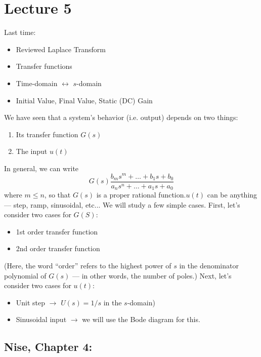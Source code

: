 \documentclass{book}
\begin{document}
\chapter*{Lecture 5}
Last time:
\begin{itemize}
	\item Reviewed Laplace Transform
	\item Transfer functions
	\item Time-domain $ \leftrightarrow $ $ s $-domain
	\item Initial Value, Final Value, Static (DC) Gain
\end{itemize}

We have seen that a system's behavior (i.e. output) depends on two things:
\begin{enumerate}
	\item Its transfer function $ G(s) $
	\item The input $ u(t) $
\end{enumerate}
In general, we can write
\[ G(s) \frac{b_ms^m+\ldots+b_1s+b_0}{a_ns^n+\ldots+a_1s+a_0} \]
where $ m\leq n $, so that $ G(s) $ is a proper rational function.$ u(t) $ can be anything --- step, ramp, sinusoidal, etc... We will study a few simple cases. First, let's consider two cases for $ G(S) $:
\begin{itemize}
	\item 1st order transfer function
	\item 2nd order transfer function
\end{itemize}
(Here, the word ``order'' refers to the highest power of $ s $ in the denominator polynomial of $ G(s) $ --- in other words, the number of poles.) Next, let's consider two cases for $ u(t) $:
\begin{itemize}
	\item Unit step $\rightarrow $ $ U(s)=1/s $ in the $ s $-domain)
	\item Sinusoidal input $ \rightarrow $ we will use the Bode diagram for this.
\end{itemize}
\section*{Nise, Chapter 4:}
\end{document}
